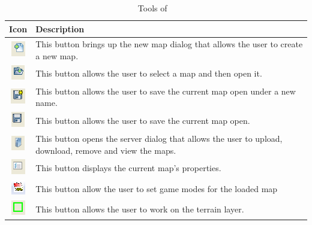 \begin{table}[]
\caption{Tools of \MapEditor\ }
\begin{tabular}{| c | p{12cm} |}
\hline\hline
Icon & Description \\ [0.5ex]
\hline 
\includegraphics*{Figures/newmap.png} & This button brings up the new map dialog that
																				allows the user to create a new map.\\	[1.0ex]
\includegraphics*{Figures/open.png} & This button allows the user to select a map and
																			then open it.\\	[1.0ex]
\includegraphics*{Figures/saveas.png} & This button allows the user to save the current
																				map open under a new name.\\	[1.0ex]
\includegraphics*{Figures/save.png} & This button allows the user to save the current 
																			map open.\\	[1.0ex]
\includegraphics*{Figures/server.png} & This button opens the server dialog that allows
																			the user to upload, download, remove and view the 
																			maps. \\	[1.0ex]
\includegraphics*{Figures/mapprop.png} & This button displays the current map's properties. \\																																			  [1.0ex]
\includegraphics*{Figures/gamemodes.png} & This button allow the user to set game modes for 
																			the loaded map \\ [1.0ex]
\includegraphics*{Figures/terrainlayer.png} & This button allows the user to work on the 																																							terrain layer. \\	[1.0ex]

\end{tabular}
\end{table}
